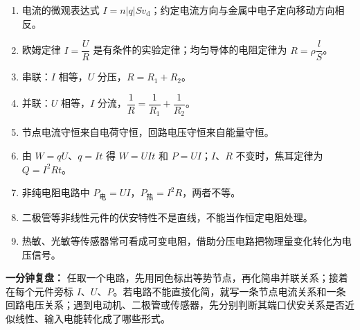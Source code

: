 \begin{enumerate}
  \item 电流的微观表达式 $I=n\lvert q\rvert Sv_{\mathrm d}$；约定电流方向与金属中电子定向移动方向相反。
  \item 欧姆定律 $I = \dfrac{U}{R}$ 是有条件的实验定律；均匀导体的电阻定律为 $R = \rho\dfrac{l}{S}$。
  \item 串联：$I$ 相等，$U$ 分压，$R = R_1 + R_2$。
  \item 并联：$U$ 相等，$I$ 分流，$\dfrac{1}{R} = \dfrac{1}{R_1} + \dfrac{1}{R_2}$。
  \item 节点电流守恒来自电荷守恒，回路电压守恒来自能量守恒。
  \item 由 $W=qU$、$q=It$ 得 $W=UIt$ 和 $P=UI$；$I$、$R$ 不变时，焦耳定律为 $Q = I^2Rt$。
  \item 非纯电阻电路中 $P_{\text{电}} = UI$，$P_{\text{热}} = I^2R$，两者不等。
  \item 二极管等非线性元件的伏安特性不是直线，不能当作恒定电阻处理。
  \item 热敏、光敏等传感器常可看成可变电阻，借助分压电路把物理量变化转化为电压信号。
\end{enumerate}

\textbf{一分钟复盘：} 任取一个电路，先用同色标出等势节点，再化简串并联关系；接着在每个元件旁标 $I$、$U$、$P$。若电路不能直接化简，就写一条节点电流关系和一条回路电压关系；遇到电动机、二极管或传感器，先分别判断其端口伏安关系是否近似线性、输入电能转化成了哪些形式。
